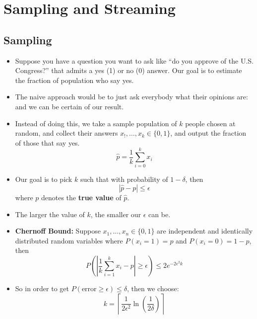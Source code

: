 \section{Sampling and Streaming}
\subsection{Sampling}
\begin{itemize}
	\item Suppose you have a question you want to ask like ``do you approve of the U.S. Congress?'' that 
		admits a yes (1) or no (0) answer. Our goal is to estimate the fraction of population who say 
		yes.
	\item The naive approach would be to just ask everybody what their opinions are: and we can be certain of 
		our result. 
	\item Instead of doing this, we take a sample population of \( k \) people chosen at random, and collect 
		their answers \( x_!, \dots, x_k \in \{0, 1\}  \), and output the fraction of those that say 
		yes. 
		\[
			\hat p = \frac{1}{k}\sum_{i = 0}^{k}x_i
		\] 
	\item Our goal is to pick \( k \) such that with probability of \( 1 - \delta \), then
		\[
		|\hat{p} - p| \le  \epsilon
		\] 
		where \( p \) denotes the \textbf{true value} of \( \hat{p} \). 
	\item The larger the value of \( k \), the smaller our \( \epsilon \) can be. 
	\item \textbf{Chernoff Bound:} Suppose \( x_1, \dots, x_n \in \{0, 1\}  \) are independent and 
		identically distributed random variables where \( P(x_i = 1) = p\) and \( P(x_{i} = 0) = 1-p \), then 
		\[
			P\left( \left| \frac{1}{k}\sum_{i = 1}^{k} x_i  - p \right| \ge  \epsilon \right) \le 2e^{-2 
			\epsilon^2 k}
		\] 
	\item So in order to get \( P(\text{error} \ge  \epsilon) \le  \delta \), then we choose: 
		\[
		k = \left\lceil \frac{1}{2\epsilon^2}\ln\left(\frac{1}{2\delta} \right)\right\rceil 
		\] 
\end{itemize}
